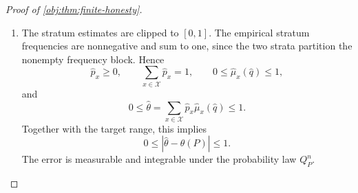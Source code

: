 \begin{proof}[Proof of \cref{obj:thm:finite-honesty}]
\begin{enumerate}
The selection rule in \cref{obj:def:total-estimator} gives
\[
\widehat q\in\mathcal D_{n,\sigma},
\qquad
A_{\widehat q}(K)\le A_q(K)
\quad\text{for every }q\in\mathcal D_{n,\sigma}.
\]
By the admissibility assertion of \cref{obj:lem:dictionary-score-rate}, the selected pair satisfies the measurability and pointwise inversion conditions, together with
\[
\widehat q(t)\ge0\quad(t\in[-1/2,1/2]),
\qquad
0<I_\kappa(\widehat q)<\infty,
\qquad
V_{\widehat q}^{(16)}<\infty,
\qquad
E_P|\ell_{\widehat q}(V)|<\infty.
\]
Its public denominator and bias bounds have the formulas
\[
b_{\widehat q}(K)
=p_{\min}c_{\mathrm{lo}}I_\kappa(\widehat q)>0,
\qquad
B_{\widehat q}(K)
=\frac{c_{\mathrm{hi}}}{c_{\mathrm{lo}}I_\kappa(\widehat q)}
  \int_{-1/2}^{1/2}|t|^{\kappa+\beta}\widehat q(t)\,dt
\ge0.
\]
Here the bias bound is nonnegative because its integrand is nonnegative. Thus the score formula in \cref{obj:synth_4} gives
\[
A_{\widehat q}(K)
=
B_{\widehat q}(K)
+\frac{12}{b_{\widehat q}(K)}\sqrt{\frac{V_{\widehat q}(K)}{n}}
+2\sqrt{\frac3n}
\ge2\sqrt{\frac3n}>0.
\]
The product experiment satisfies the sampling condition in \cref{obj:ass:iid}. Applying \cref{obj:lem:public-error-certificate} to the selected pair, and using
\(\widehat\theta=\widehat\theta_{\widehat q}\) on nonempty blocks, therefore gives
\[
E_{Q_P^n}\!\left[|\widehat\theta-\theta(P)|\right]
\le A_{\widehat q}(K).
\]

\item The stratum estimates are clipped to \([0,1]\). The empirical stratum frequencies are nonnegative and sum to one, since the two strata partition the nonempty frequency block. Hence
\[
\widehat p_x\ge0,\qquad
\sum_{x\in\mathcal X}\widehat p_x=1,\qquad
0\le\widehat\mu_x(\widehat q)\le1,
\]
and
\[
0
\le
\widehat\theta
=\sum_{x\in\mathcal X}\widehat p_x\widehat\mu_x(\widehat q)
\le1.
\]
Together with the target range, this implies
\[
0\le|\widehat\theta-\theta(P)|\le1.
\]
The error is measurable and integrable under the probability law \(Q_P^n\).


\end{enumerate}
\end{proof}
